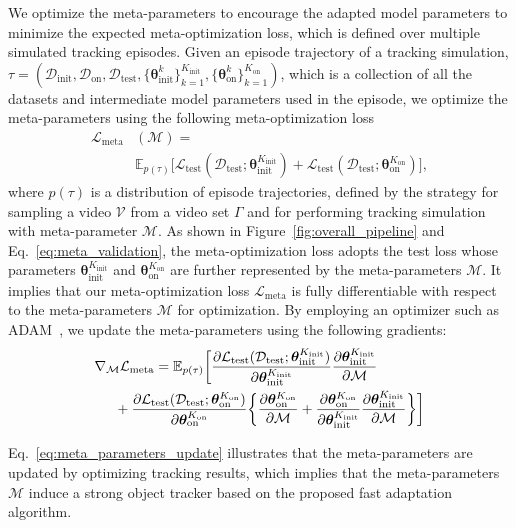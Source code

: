 \documentclass[letterpaper]{article} %
\def \datainit{\mathcal{D}_\text{init}}
\def \dataonline{\mathcal{D}_\text{on}}
\def \dataval{\mathcal{D}_\text{test}}
\def \thetainitadapt{\boldsymbol{\theta}_\text{init}}
\def \thetaonlineadapt{\boldsymbol{\theta}_\text{on}}
\def \Kinit{K_\text{init}}
\def \Konline{K_\text{on}}
\def \lossval{\mathcal{L}_\text{test}}
\def \lossmeta{\mathcal{L}_\text{meta}}
\begin{document}
We optimize the meta-parameters to encourage the adapted model parameters to minimize the expected meta-optimization loss, which is defined over multiple simulated tracking episodes.
Given an episode trajectory of a tracking simulation, $\tau=(\datainit, \dataonline, \dataval, \{\thetainitadapt^k\}_{k=1}^{\Kinit}, \{\thetaonlineadapt^k\}_{k=1}^{\Konline})$, which is a collection of all the datasets and intermediate model parameters used in the episode, we optimize the meta-parameters using the following meta-optimization loss
\begin{align}
\label{eq:meta_validation}
\lossmeta&(\mathcal{M}) = \\
&\mathbb{E}_{p(\tau)}\big[\lossval(\dataval;\thetainitadapt^{\Kinit}) + \lossval(\dataval;\thetaonlineadapt^{\Konline})\big], \nonumber
\end{align}
where $p(\tau)$ is a distribution of episode trajectories, defined by the strategy for sampling a video $\mathcal{V}$ from a video set $\Gamma$ and for performing tracking simulation with meta-parameter $\mathcal{M}$.
As shown in Figure~\ref{fig:overall_pipeline} and Eq.~\eqref{eq:meta_validation}, the meta-optimization loss adopts the test loss whose parameters $\thetainitadapt^{\Kinit}$ and $\thetaonlineadapt^{\Konline}$ are further represented by the meta-parameters $\mathcal{M}$.
It implies that our meta-optimization loss $\lossmeta$ is fully differentiable with respect to the meta-parameters $\mathcal{M}$ for optimization.
By employing an optimizer such as ADAM~\cite{diederik2014adam}, we update the meta-parameters using the following gradients:
\begin{equation}
\begin{split}
&%
\nabla_\mathcal{M}\lossmeta=\mathbb{E}_{p(\tau)}\bigg[
\frac{\partial \lossval(\dataval;\thetainitadapt^{\Kinit})}{\partial\thetainitadapt^{\Kinit}}
\frac{\partial\thetainitadapt^{\Kinit}}{\partial\mathcal{M}}
\\
&\hspace{0.5cm}%
+
\frac{\partial \lossval(\dataval;\thetaonlineadapt^{\Konline})}{\partial\thetaonlineadapt^{\Konline}}
\bigg\{
\frac{\partial\thetaonlineadapt^{\Konline}}{\partial\mathcal{M}}
+
\frac{\partial\thetaonlineadapt^{\Konline}}{\partial\thetainitadapt^{\Kinit}}
\frac{\partial\thetainitadapt^{\Kinit}}{\partial\mathcal{M}}
\bigg\}
\bigg]
\label{eq:meta_parameters_update}
\end{split}
\end{equation}

Eq.~\eqref{eq:meta_parameters_update} illustrates that the meta-parameters are updated by optimizing tracking results, which implies that the meta-parameters $\mathcal{M}$ induce a strong object tracker based on the proposed fast adaptation algorithm.
\end{document}
